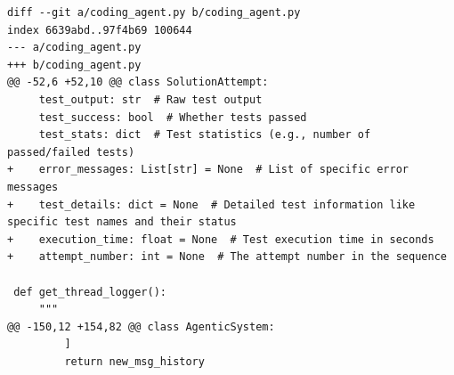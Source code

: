 \documentclass{article} %
\begin{document}
\begin{lstlisting}[style=diffstyle]
diff --git a/coding_agent.py b/coding_agent.py
index 6639abd..97f4b69 100644
--- a/coding_agent.py
+++ b/coding_agent.py
@@ -52,6 +52,10 @@ class SolutionAttempt:
     test_output: str  # Raw test output
     test_success: bool  # Whether tests passed
     test_stats: dict  # Test statistics (e.g., number of passed/failed tests)
+    error_messages: List[str] = None  # List of specific error messages
+    test_details: dict = None  # Detailed test information like specific test names and their status
+    execution_time: float = None  # Test execution time in seconds
+    attempt_number: int = None  # The attempt number in the sequence
 
 def get_thread_logger():
     """
@@ -150,12 +154,82 @@ class AgenticSystem:
         ]
         return new_msg_history
 

\end{lstlisting}
\end{document}
